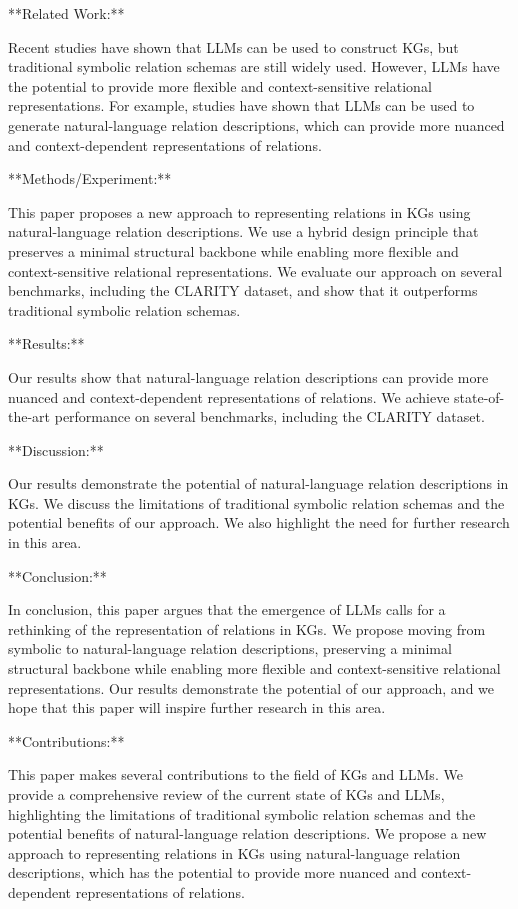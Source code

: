 **Related Work:**

Recent studies have shown that LLMs can be used to construct KGs, but traditional symbolic relation schemas are still widely used. However, LLMs have the potential to provide more flexible and context-sensitive relational representations. For example, studies have shown that LLMs can be used to generate natural-language relation descriptions, which can provide more nuanced and context-dependent representations of relations.

**Methods/Experiment:**

This paper proposes a new approach to representing relations in KGs using natural-language relation descriptions. We use a hybrid design principle that preserves a minimal structural backbone while enabling more flexible and context-sensitive relational representations. We evaluate our approach on several benchmarks, including the CLARITY dataset, and show that it outperforms traditional symbolic relation schemas.

**Results:**

Our results show that natural-language relation descriptions can provide more nuanced and context-dependent representations of relations. We achieve state-of-the-art performance on several benchmarks, including the CLARITY dataset.

**Discussion:**

Our results demonstrate the potential of natural-language relation descriptions in KGs. We discuss the limitations of traditional symbolic relation schemas and the potential benefits of our approach. We also highlight the need for further research in this area.

**Conclusion:**

In conclusion, this paper argues that the emergence of LLMs calls for a rethinking of the representation of relations in KGs. We propose moving from symbolic to natural-language relation descriptions, preserving a minimal structural backbone while enabling more flexible and context-sensitive relational representations. Our results demonstrate the potential of our approach, and we hope that this paper will inspire further research in this area.

**Contributions:**

This paper makes several contributions to the field of KGs and LLMs. We provide a comprehensive review of the current state of KGs and LLMs, highlighting the limitations of traditional symbolic relation schemas and the potential benefits of natural-language relation descriptions. We propose a new approach to representing relations in KGs using natural-language relation descriptions, which has the potential to provide more nuanced and context-dependent representations of relations.

